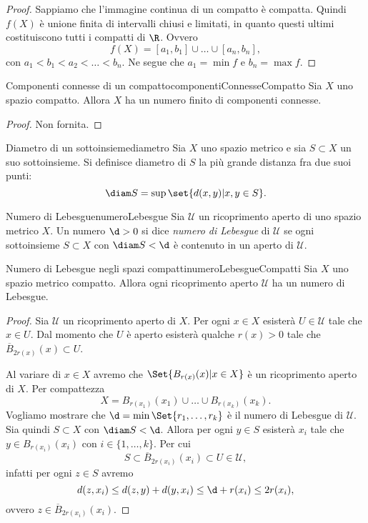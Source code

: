 \begin{proof}
	Sappiamo che l'immagine continua di un compatto è compatta.
	Quindi \(f(X)\) è unione finita di intervalli chiusi e limitati, in quanto questi ultimi costituiscono tutti i compatti di \(\R\).
	Ovvero
	\[
		f(X) = [a_1,b_1] \cup \ldots \cup [a_n,b_n],
	\]
	con \(a_1<b_1<a_2<\ldots<b_n\).
	Ne segue che \(a_1 = \min f\) e \(b_n = \max f\).
\end{proof}

\begin{prop}{Componenti connesse di un compatto}{componentiConnesseCompatto}
	Sia \(X\) uno spazio compatto.
	Allora \(X\) ha un numero finito di componenti connesse.
\end{prop}

\begin{proof}
	Non fornita.
\end{proof}

\begin{defn}{Diametro di un sottoinsieme}{diametro}
	Sia \(X\) uno spazio metrico e sia \(S\subset X\) un suo sottoinsieme.
	Si definisce diametro di \(S\) la più grande distanza fra due suoi punti:
	\[
		\diam S = \sup\set{d(x,y) | x,y\in S}.
	\]
\end{defn}

\begin{defn}{Numero di Lebesgue}{numeroLebesgue}
	Sia \(\mathcal{U}\) un ricoprimento aperto di uno spazio metrico \(X\).
	Un numero \(\d>0\) si dice \emph{numero di Lebesgue} di \(\mathcal{U}\) se ogni sottoinsieme \(S\subset X\) con \(\diam S<\d\) è contenuto in un aperto di \(\mathcal{U}\).
\end{defn}

\begin{prop}{Numero di Lebesgue negli spazi compatti}{numeroLebesgueCompatti}
	Sia \(X\) uno spazio metrico compatto.
	Allora ogni ricoprimento aperto \(\mathcal{U}\) ha un numero di Lebesgue.
\end{prop}

\begin{proof}
	Sia \(\mathcal{U}\) un ricoprimento aperto di \(X\).
	Per ogni \(x\in X\) esisterà \(U\in \mathcal{U}\) tale che \(x\in U\).
	Dal momento che \(U\) è aperto esisterà qualche \(r(x)>0\) tale che \(\overline{B}_{2r(x)}(x)\subset U\).

	Al variare di \(x\in X\) avremo che \(\Set{B_{r(x)}(x) | x\in X}\) è un ricoprimento aperto di \(X\).
	Per compattezza
	\[
		X = B_{r(x_1)}(x_1) \cup \ldots \cup B_{r(x_k)}(x_k).
	\]
	Vogliamo mostrare che \(\d = \min \Set{r_1,\ldots,r_k}\) è il numero di Lebesgue di \(\mathcal{U}\).
	Sia quindi \(S\subset X\) con \(\diam S < \d\).
	Allora per ogni \(y\in S\) esisterà \(x_i\) tale che \(y\in B_{r(x_i)}(x_i)\) con \(i\in \{1,\ldots,k\}\).
	Per cui
	\[
		S \subset \overline{B}_{2r(x_i)}(x_i) \subset U \in \mathcal{U},
	\]
	infatti per ogni \(z\in S\) avremo
	\[
		d(z,x_i) \le d(z,y) + d(y,x_i) \le \d + r(x_i) \le 2r(x_i),
	\]
	ovvero \(z\in \overline{B}_{2r(x_i)}(x_i)\).
\end{proof}
